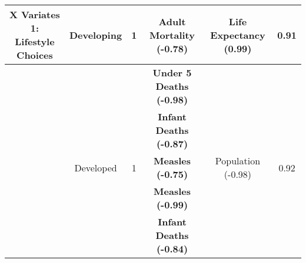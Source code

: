 \begin{table}[h!]
{\begin{tabular}{|cc|cccc|}
\multicolumn{1}{|c|}{\multirow{-4}{*}{\cellcolor[HTML]{EFEFEF}\textbf{X Variates 1: Lifestyle Choices}}}    & \multirow{-3}{*}{Developing} & \multicolumn{1}{c|}{\multirow{-3}{*}{1}}                    & \multicolumn{1}{c|}{\textbf{Adult Mortality (-0.78)}}                       & \multicolumn{1}{c|}{\multirow{-3}{*}{Life Expectancy (0.99)}}               & \multirow{-3}{*}{0.91}         \\ \hline
\multicolumn{1}{|c|}{\cellcolor[HTML]{EFEFEF}}                                                              &                              & \multicolumn{1}{c|}{}                                       & \multicolumn{1}{c|}{\textbf{Under 5 Deaths (-0.98)}}                        & \multicolumn{1}{c|}{}                                                       &                                \\ \cline{4-4}
\multicolumn{1}{|c|}{\cellcolor[HTML]{EFEFEF}}                                                              &                              & \multicolumn{1}{c|}{}                                       & \multicolumn{1}{c|}{\textbf{Infant Deaths (-0.87)}}                         & \multicolumn{1}{c|}{}                                                       &                                \\ \cline{4-4}
\multicolumn{1}{|c|}{\cellcolor[HTML]{EFEFEF}}                                                              & \multirow{-3}{*}{Developed}  & \multicolumn{1}{c|}{\multirow{-3}{*}{1}}                    & \multicolumn{1}{c|}{\textbf{Measles (-0.75)}}                               & \multicolumn{1}{c|}{\multirow{-3}{*}{Population (-0.98)}}                   & \multirow{-3}{*}{0.92}         \\ \cline{2-6} 
\multicolumn{1}{|c|}{\cellcolor[HTML]{EFEFEF}}                                                              &                              & \multicolumn{1}{c|}{}                                       & \multicolumn{1}{c|}{\textbf{Measles (-0.99)}}                               & \multicolumn{1}{c|}{}                                                       &                                \\ \cline{4-4}
\multicolumn{1}{|c|}{\cellcolor[HTML]{EFEFEF}}                                                              &                              & \multicolumn{1}{c|}{}                                       & \multicolumn{1}{c|}{\textbf{Infant Deaths (-0.84)}}                         & \multicolumn{1}{c|}{}                                                       &                                \\ \cline{4-4}

\end{tabular}}
\end{table}
